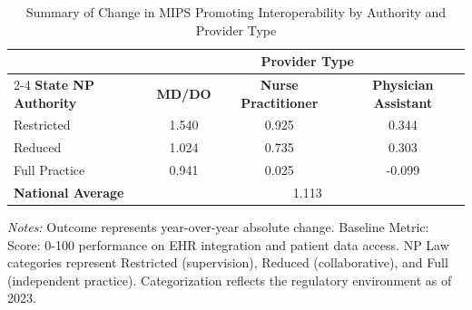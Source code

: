 \begin{table}[htbp]
    \centering
    \caption{Summary of Change in MIPS Promoting Interoperability by Authority and Provider Type}
    \label{tab:d_mips_pi_score_provtype}
    \vspace{0.2cm}
    \begin{tabular}{lccc}
        \toprule
        & \multicolumn{3}{c}{\textbf{Provider Type}} \\
        \cmidrule(lr){2-4}
        \textbf{State NP Authority} & \textbf{MD/DO} & \textbf{Nurse Practitioner} & \textbf{Physician Assistant} \\
        \midrule
        Restricted & 1.540 & 0.925 & 0.344 \\
        Reduced & 1.024 & 0.735 & 0.303 \\
        Full Practice & 0.941 & 0.025 & -0.099 \\
        \midrule
        \textbf{National Average} & \multicolumn{3}{c}{1.113} \\
        \bottomrule
    \end{tabular}
    \vspace{0.1cm}
    \begin{minipage}{0.85\textwidth}
        \footnotesize \textit{Notes:} Outcome represents year-over-year absolute change. Baseline Metric: Score: 0-100 performance on EHR integration and patient data access. NP Law categories represent Restricted (supervision), Reduced (collaborative), and Full (independent practice). Categorization reflects the regulatory environment as of 2023.
    \end{minipage}
\end{table}